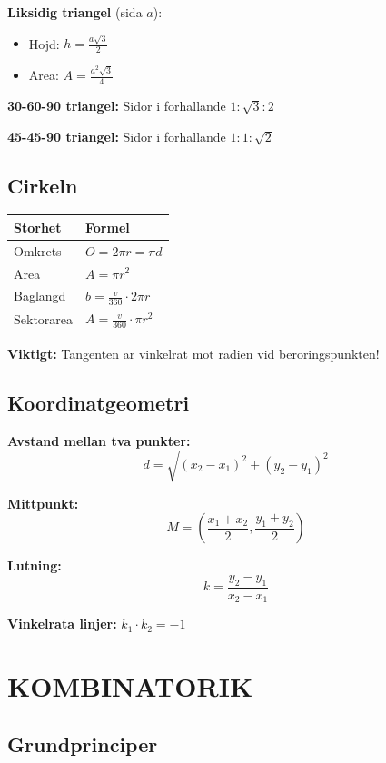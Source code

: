 \documentclass[11pt,a4paper]{article}
\begin{document}
\textbf{Liksidig triangel} (sida $a$):
\begin{itemize}
\item Hojd: $h = \frac{a\sqrt{3}}{2}$
\item Area: $A = \frac{a^2\sqrt{3}}{4}$
\end{itemize}

\textbf{30-60-90 triangel:} Sidor i forhallande $1 : \sqrt{3} : 2$

\textbf{45-45-90 triangel:} Sidor i forhallande $1 : 1 : \sqrt{2}$

\subsection{Cirkeln}

\begin{tabular}{|l|l|}
\hline
\textbf{Storhet} & \textbf{Formel} \\
\hline
Omkrets & $O = 2\pi r = \pi d$ \\
Area & $A = \pi r^2$ \\
Baglangd & $b = \frac{v}{360} \cdot 2\pi r$ \\
Sektorarea & $A = \frac{v}{360} \cdot \pi r^2$ \\
\hline
\end{tabular}

\begin{tcolorbox}[colback=yellow!10, colframe=orange]
\textbf{Viktigt:} Tangenten ar vinkelrat mot radien vid beroringspunkten!
\end{tcolorbox}

\subsection{Koordinatgeometri}

\textbf{Avstand mellan tva punkter:}
\[ d = \sqrt{(x_2-x_1)^2 + (y_2-y_1)^2} \]

\textbf{Mittpunkt:}
\[ M = \left(\frac{x_1+x_2}{2}, \frac{y_1+y_2}{2}\right) \]

\textbf{Lutning:}
\[ k = \frac{y_2 - y_1}{x_2 - x_1} \]

\textbf{Vinkelrata linjer:} $k_1 \cdot k_2 = -1$

\section{KOMBINATORIK}

\subsection{Grundprinciper}
\end{document}
